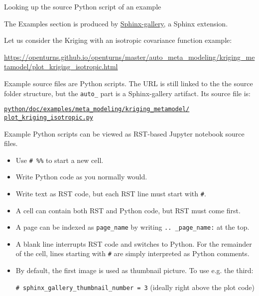 \documentclass[8pt, handout]{beamer}
\begin{document}
\begin{frame}{Looking up the source Python script of an example}

The Examples section is produced by \href{https://sphinx-gallery.github.io/stable/index.html}{\alert{Sphinx-gallery}}, a Sphinx extension.

Let us consider the \alert{Kriging with an isotropic covariance function} example:

\url{https://openturns.github.io/openturns/master/auto_meta_modeling/kriging_metamodel/plot_kriging_isotropic.html}

Example source files are \alert{Python scripts}.
The URL is still linked to the the source folder structure,
but the \texttt{auto\_} part is a Sphinx-gallery artifact. Its source file is:

\href{https://github.com/openturns/openturns/blob/master/python/doc/examples/meta_modeling/kriging_metamodel/plot_kriging_isotropic.py}{\texttt{python/doc/examples/meta\_modeling/kriging\_metamodel/\\plot\_kriging\_isotropic.py}}

Example Python scripts can be viewed as RST-based Jupyter notebook source files.

\begin{itemize}
    \item Use \alert{\texttt{\# \%\%}} to start a \alert{new cell}.
    \item Write \alert{Python code} as you \alert{normally} would.
    \item Write \alert{text as RST code}, but each RST line must start with \alert{\texttt{\#}}.
    \item A cell can contain both RST and Python code, but \alert{RST must come first}.  
    \item A page can be \alert{indexed} as \texttt{page\_name} by writing \texttt{.. \_page\_name:} at the top.
    \item A \alert{blank line} interrupts RST code and \alert{switches to Python}. For the remainder of the cell, lines starting with \alert{\texttt{\#}} are simply interpreted as Python comments.
    \item By default, the first image is used as \alert{thumbnail picture}. To use e.g. the third: %

    \texttt{\# sphinx\_gallery\_thumbnail\_number = 3} (ideally right above the plot code)
\end{itemize}

\end{frame}
\end{document}

